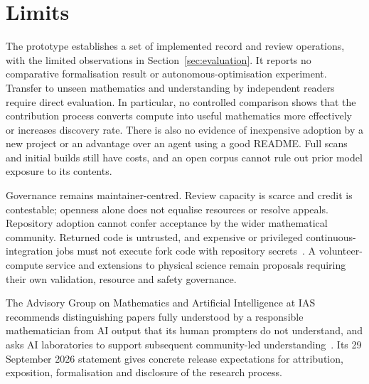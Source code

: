 \documentclass[10pt]{article}
\begin{document}
\section{Limits}\label{sec:limits}\label{sec:conclusion}
The prototype establishes a set of implemented record and review operations, with the limited observations in Section~\ref{sec:evaluation}. It reports no comparative formalisation result or autonomous-optimisation experiment.
Transfer to unseen mathematics and understanding by independent readers require direct evaluation.
In particular, no controlled comparison shows that the contribution process converts compute into useful mathematics more effectively or increases discovery rate.
There is also no evidence of inexpensive adoption by a new project or an advantage over an agent using a good README.
Full scans and initial builds still have costs, and an open corpus cannot rule out prior model exposure to its contents.

Governance remains maintainer-centred. Review capacity is scarce and credit is contestable; openness alone does not equalise resources or resolve appeals.
Repository adoption cannot confer acceptance by the wider mathematical community.
Returned code is untrusted, and expensive or privileged continuous-integration jobs must not execute fork code with repository secrets~\cite{githubsecurity}.
A volunteer-compute service and extensions to physical science remain proposals requiring their own validation, resource and safety governance.

The Advisory Group on Mathematics and Artificial Intelligence at IAS
recommends distinguishing papers fully understood by a responsible
mathematician from AI output that its human prompters do not understand,
and asks AI laboratories to support subsequent community-led
understanding~\cite{agmai2026}. Its 29 September 2026 statement gives
concrete release expectations for attribution, exposition, formalisation
and disclosure of the research process.
\end{document}
